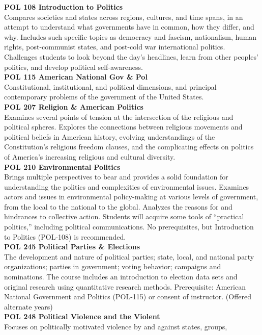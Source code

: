 \documentclass[
  letterpaper,
]{scrbook}
\begin{document}
\textbf{POL 108 Introduction to Politics}\\
Compares societies and states across regions, cultures, and time spans,
in an attempt to understand what governments have in common, how they
differ, and why. Includes such specific topics as democracy and fascism,
nationalism, human rights, post-communist states, and post-cold war
international politics. Challenges students to look beyond the day's
headlines, learn from other peoples' politics, and develop political
self-awareness.\\
\textbf{POL 115 American National Gov \& Pol}\\
Constitutional, institutional, and political dimensions, and principal
contemporary problems of the government of the United States.\\
\textbf{POL 207 Religion \& American Politics}\\
Examines several points of tension at the intersection of the religious
and political spheres. Explores the connections between religious
movements and political beliefs in American history, evolving
understandings of the Constitution's religious freedom clauses, and the
complicating effects on politics of America's increasing religious and
cultural diversity.\\
\textbf{POL 210 Environmental Politics}\\
Brings multiple perspectives to bear and provides a solid foundation for
understanding the politics and complexities of environmental issues.
Examines actors and issues in environmental policy-making at various
levels of government, from the local to the national to the global.
Analyzes the reasons for and hindrances to collective action. Students
will acquire some tools of ``practical politics,'' including political
communications. No prerequisites, but Introduction to Politics (POL-108)
is recommended.\\
\textbf{POL 245 Political Parties \& Elections}\\
The development and nature of political parties; state, local, and
national party organizations; parties in government; voting behavior;
campaigns and nominations. The course includes an introduction to
election data sets and original research using quantitative research
methods. Prerequisite: American National Government and Politics
(POL-115) or consent of instructor. (Offered alternate years)\\
\textbf{POL 248 Political Violence and the Violent}\\
Focuses on politically motivated violence by and against states, groups,
\end{document}
